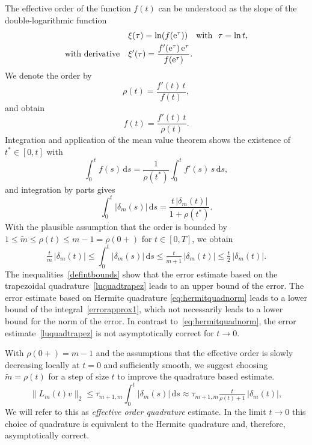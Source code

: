 \documentclass[smallextended]{svjour3pre}%
\numberwithin{equation}{section}
\numberwithin{figure}{section}
\numberwithin{table}{section}
\newcommand\tjnew[1]{{#1}}
\newcommand{\dd}{\mathrm{d}}
\newcommand{\ee}{{\rm e}}
\begin{document}
The effective order of the function $ f(t) $ can be understood as the slope of the double-logarithmic function
\begin{align*}
&\xi(\tau)=\ln(f(\ee^{\tau}))~~~\text{with}~~\tau=\ln t, \\
\text{with derivative} \quad &\xi'(\tau)=\frac{f'(\ee^{\tau})\,\ee^{\tau}}{f(\ee^{\tau})}.
\end{align*}
We denote the order by
\begin{equation}\label{def:effectiveorder}
\rho(t)=\frac{f'(t)\,t}{f(t)},
\end{equation}
and obtain
\begin{equation*}
f(t)=\frac{f'(t)\,t}{\rho(t)}.
\end{equation*}
Integration and application of the mean value theorem shows the existence of $t^\ast\in[0,t]$ with
\begin{equation*}
\int_0^t f(s)\,\dd s= \frac{1}{\rho(t^\ast)} \int_0^t f'(s)\,s\,\dd s,
\end{equation*}
and integration by parts gives
\begin{equation*}
\int_0^t |\delta_m(s)| \,\dd s = \frac{t\, |\delta_m(t)|}{1+\rho(t^\ast)}.
\end{equation*}
With the plausible assumption that the order is bounded by $1\leq \tilde{m}\leq \rho(t) \leq m-1 =\rho(0+)$ for $t\in[0,T]$, we obtain
\begin{equation}\label{defintbounds}
\tfrac{t}{m}\,|\delta_m(t)| \leq \int_0^t |\delta_m(s)| \,\dd s \leq \tfrac{t}{\tilde{m}+1}\,|\delta_m(t)| \leq \tfrac{t}{2}\,|\delta_m(t)|.
\end{equation}
The inequalities~\eqref{defintbounds}
show that the error estimate based on the trapezoidal quadrature~\eqref{luquadtrapez} leads to an upper bound of the error.
The error estimate based on Hermite quadrature \eqref{eq:hermitquadnorm} leads to a lower bound of the integral~\eqref{errorapprox1},
which not necessarily leads to a lower bound for the norm of the error.
\tjnew{In contrast to~\eqref{eq:hermitquadnorm}, the error estimate~\eqref{luquadtrapez} is not asymptotically correct for $ t \to 0 $.} 

\begin{remark}\label{remark:quadnew}
With $\rho(0+)=m-1$ and the assumptions that the effective order is slowly decreasing locally at $t=0$ and sufficiently smooth,
we suggest choosing $\tilde{m}=\rho(t)$ for a step of size $t$ \tjnew{to} improve the quadrature based estimate.
\begin{equation}\label{eq:effoquad}
\|L_m(t)v\|_2 \leq \tau_{m+1,m} \int_0^t |\delta_m(s)| \, \dd s \approx \tau_{m+1,m} \tfrac{t}{\rho(t)+1} \,|\delta_m(t)|,
\end{equation}
We will refer to this as \emph{effective order quadrature} estimate.
In the limit $t\to0$ this choice of quadrature is equivalent to the Hermite quadrature and, therefore, asymptotically correct.
\end{remark}
\end{document}
